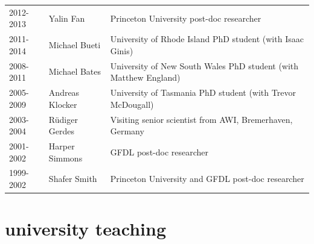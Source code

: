 \documentclass{article}
\begin{document}
\begin{tabular}{lll}
2012-2013     & Yalin Fan              & Princeton University post-doc researcher \\
2011-2014     & Michael Bueti       & University of Rhode Island  PhD student (with Isaac Ginis) \\
2008-2011     & Michael Bates       & University of New South Wales PhD student (with Matthew England) \\
2005-2009     & Andreas Klocker   & University of Tasmania  PhD student (with Trevor McDougall) \\
2003-2004     & {R\"{u}diger} Gerdes  & Visiting senior scientist from AWI, Bremerhaven, Germany \\
2001-2002     & Harper Simmons   & GFDL post-doc researcher \\
1999-2002     & Shafer Smith         & Princeton University and GFDL post-doc researcher     \\
\end{tabular}

\section*{\sc  \color{Maroon}  university teaching}
\vspace{-.3cm}
\end{document}
